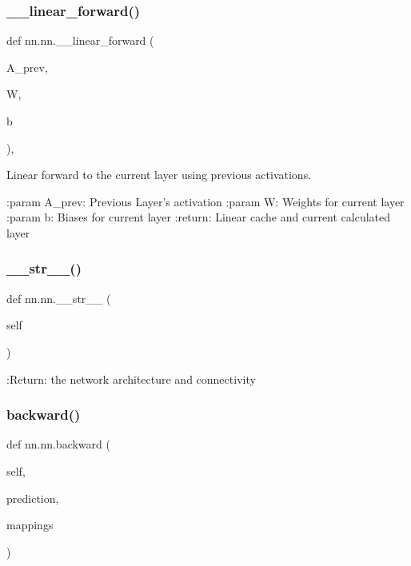 \subsubsection{\texorpdfstring{\+\_\+\+\_\+linear\+\_\+forward()}{\_\_linear\_forward()}}
{\footnotesize\ttfamily def nn.\+nn.\+\_\+\+\_\+linear\+\_\+forward (\begin{DoxyParamCaption}\item[{}]{A\+\_\+prev,  }\item[{}]{W,  }\item[{}]{b }\end{DoxyParamCaption})\hspace{0.3cm}{\ttfamily [static]}, {\ttfamily [private]}}

\begin{DoxyVerb}Linear forward to the current layer using previous activations.

:param A_prev: Previous Layer's activation
:param W: Weights for current layer
:param b: Biases for current layer
:return: Linear cache and current calculated layer
\end{DoxyVerb}
 \mbox{\label{classnn_1_1nn_a1c967a0ae06ef2a7e8077cc9aa29aabc}} 
\subsubsection{\texorpdfstring{\+\_\+\+\_\+str\+\_\+\+\_\+()}{\_\_str\_\_()}}
{\footnotesize\ttfamily def nn.\+nn.\+\_\+\+\_\+str\+\_\+\+\_\+ (\begin{DoxyParamCaption}\item[{}]{self }\end{DoxyParamCaption})}

\begin{DoxyVerb}:Return: the network architecture and connectivity
\end{DoxyVerb}
 \mbox{\label{classnn_1_1nn_a53a7beb698fe127ebb1f636fccbaa126}} 
\subsubsection{\texorpdfstring{backward()}{backward()}}
{\footnotesize\ttfamily def nn.\+nn.\+backward (\begin{DoxyParamCaption}\item[{}]{self,  }\item[{}]{prediction,  }\item[{}]{mappings }\end{DoxyParamCaption})}

